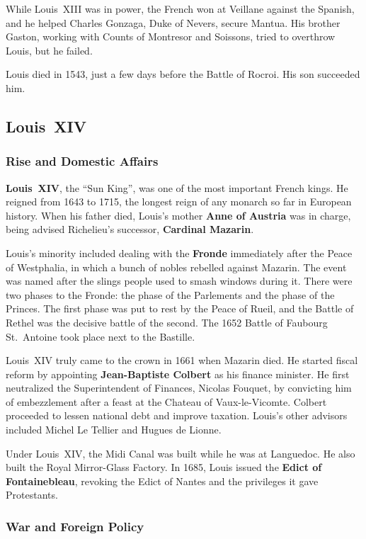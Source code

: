 While Louis~XIII was in power, the French won at Veillane against the Spanish,
and he helped Charles Gonzaga, Duke of Nevers, secure Mantua.
His brother Gaston, working with Counts of Montresor and Soissons,
tried to overthrow Louis, but he failed.

Louis died in 1543, just a few days before the Battle of Rocroi.
His son succeeded him.

\subsection*{Louis~XIV}

\subsubsection*{Rise and Domestic Affairs}

\textbf{Louis~XIV}, the ``Sun King'', was one of the most important French kings.
He reigned from 1643 to 1715, the longest reign of any monarch so far in European history.
When his father died,
Louis's mother \textbf{Anne of Austria} was in charge, being advised Richelieu's successor, \textbf{Cardinal Mazarin}.

Louis's minority included dealing with the \textbf{Fronde} immediately after the Peace of Westphalia,
in which a bunch of nobles rebelled against Mazarin.
The event was named after the slings people used to smash windows during it.
There were two phases to the Fronde: the phase of the Parlements and the phase of the Princes.
The first phase was put to rest by the Peace of Rueil,
and the Battle of Rethel was the decisive battle of the second.
The 1652 Battle of Faubourg St.\ Antoine took place next to the Bastille.

Louis~XIV truly came to the crown in 1661 when Mazarin died.
He started fiscal reform by appointing \textbf{Jean-Baptiste Colbert} as his finance minister.
He first neutralized the Superintendent of Finances, Nicolas Fouquet,
by convicting him of embezzlement after a feast at the Chateau of Vaux-le-Vicomte.
Colbert proceeded to lessen national debt and improve taxation.
Louis's other advisors included Michel Le Tellier and Hugues de Lionne.

Under Louis~XIV, the Midi Canal was built while he was at Languedoc.
He also built the Royal Mirror-Glass Factory.
In 1685, Louis issued the \textbf{Edict of Fontainebleau},
revoking the Edict of Nantes and the privileges it gave Protestants.

\subsubsection*{War and Foreign Policy}

